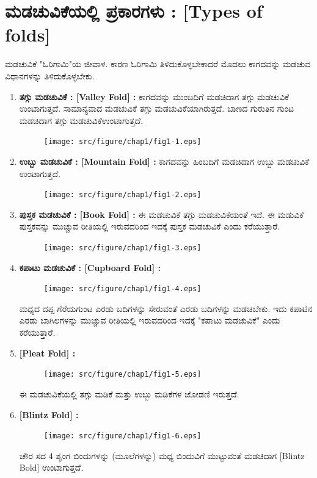 \section{ಮಡಚುವಿಕೆಯಲ್ಲಿ ಪ್ರಕಾರಗಳು : [Types of folds]}\label{sec1.6}%
ಮಡಚುವಿಕೆ "ಓರಿಗಾಮಿ"ಯ ಜೀವಾಳ. ಕಾರಣ ಓರಿಗಾಮಿ ತಿಳಿದುಕೊಳ್ಳಬೇಕಾದರೆ ಮೊದಲು ಕಾಗದವನ್ನು ಮಡಚುವ ವಿಧಾನಗಳನ್ನು ತಿಳಿದುಕೊಳ್ಳಬೇಕು. 
\begin{enumerate}
\item \textbf{ತಗ್ಗು ಮಡಚುವಿಕೆ : [Valley Fold] :} ಕಾಗದವನ್ನು ಮುಂಬದಿಗೆ ಮಡಚಿದಾಗ ತಗ್ಗು ಮಡಚುವಿಕೆ ಉಂಟಾಗುತ್ತದೆ. ಸಾಮಾನ್ಯವಾದ ಮಡಚುವಿಕೆ ತಗ್ಗು ಮಡಚುವಿಕೆಯಾಗಿರುತ್ತದೆ. ಬಾಣದ ಗುರುತಿನ  ಗುಂಟ ಮಡಚಿದಾಗ ತಗ್ಗು ಮಡಚುವಿಕೆ\break ಉಂಟಾಗುತ್ತದೆ. 
\begin{figure}[H]
\centering
\texttt{[image: src/figure/chap1/fig1-1.eps]}
\end{figure}

\item  \textbf{ಉಬ್ಬು ಮಡಚುವಿಕೆ : [Mountain Fold] :} ಕಾಗದವನ್ನು ಹಿಂಬದಿಗೆ ಮಡಚಿದಾಗ ಉಬ್ಬು ಮಡಚುವಿಕೆ ಉಂಟಾಗುತ್ತದೆ. 
\begin{figure}[H]
\centering
\texttt{[image: src/figure/chap1/fig1-2.eps]}
\end{figure}


\item  \textbf{ಪುಸ್ತಕ ಮಡಚುವಿಕೆ : [Book Fold] :} 
ಈ ಮಡಚುವಿಕೆ ತಗ್ಗು ಮಡಚುವಿಕೆ\break ಯಂತೆ ಇದೆ. ಈ ಮಡುವಿಕೆ ಪುಸ್ತಕವನ್ನು ಮುಚ್ಚುವ ರೀತಿಯಲ್ಲಿ ಇರುವದರಿಂದ ಇದಕ್ಕೆ ಪುಸ್ತಕ ಮಡಚುವಿಕೆ ಎಂದು ಕರೆಯುತ್ತಾರೆ. 
\begin{figure}[H]
\centering
\texttt{[image: src/figure/chap1/fig1-3.eps]}
\end{figure}


\item  \textbf{ಕಪಾಟು ಮಡಚುವಿಕೆ : [Cupboard Fold] :} 
\begin{figure}[H]
\centering
\texttt{[image: src/figure/chap1/fig1-4.eps]}
\end{figure}


ಮಧ್ಯದ ದಪ್ಪ ಗೆರೆಯಗುಂಟ ಎರಡು ಬದಿಗಳನ್ನು ಸೇರುವಂತೆ ಎರಡು ಬದಿಗಳನ್ನು ಮಡಚಬೇಕು. ಇದು ಕಪಾಟಿನ ಎರಡು ಬಾಗಿಲಗಳನ್ನು ಮುಚ್ಚುವ ರೀತಿಯಲ್ಲಿ ಇರುವದರಿಂದ ಇದಕ್ಕೆ "ಕಪಾಟು ಮಡಚುವಿಕೆ" ಎಂದು ಕರೆಯುತ್ತಾರೆ. 

\item  \textbf{[Pleat Fold] :}
\begin{figure}[H]
\centering
\texttt{[image: src/figure/chap1/fig1-5.eps]}
\end{figure}


ಈ ಮಡಚುವಿಕೆಯಲ್ಲಿ ತಗ್ಗು ಮಡಿಕೆ ಮತ್ತು ಉಬ್ಬು ಮಡಿಕೆಗಳ ಜೋಡಣಿ ಇರುತ್ತದೆ. 

\item  \textbf{[Blintz Fold] :}
\begin{figure}[H]
\centering
\texttt{[image: src/figure/chap1/fig1-6.eps]}
\end{figure}


ಚೌರ ಸದ 4  ಶೃಂಗ ಬಿಂದುಗಳನ್ನು (ಮೂಲೆಗಳನ್ನು) ಮಧ್ಯ ಬಿಂದುವಿಗೆ ಮುಟ್ಟು\break ವಂತೆ ಮಡಚಿದಾಗ [Blintz Bold] ಉಂಟಾಗುತ್ತದೆ. 
 \end{enumerate}

